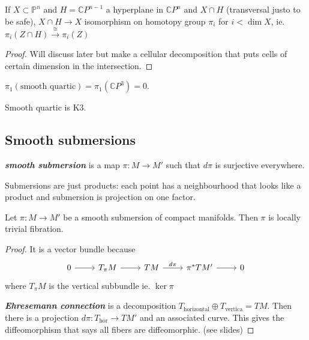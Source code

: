 \begin{thm}\leavevmode
	If $X \subset \mathbb{P}^n$ and $H=\mathbb{C}P^{n-1}$ a hyperplane in $\mathbb{C}P^{n}$ and $X\cap H$ (transversal justo to be safe), $X\cap H\to  X$ isomorphism on homotopy group $\pi_i$ for  $i<\dim X$, ie.
	$\pi_{i}(Z\cap H)\overset{\cong }{\longrightarrow}\pi_{i}(Z)$
\end{thm}

\begin{proof}
	Will discuss later but make a cellular decomposition that puts cells of certain dimension in the intersection.
\end{proof}

\begin{coro}
	$\pi_{1}(\text{smooth quartic} ) =\pi_{1}(\mathbb{C}P^{3}) =0$.
\end{coro}

\begin{coro}
	Smooth quartic is K3.
\end{coro}

\subsection{Smooth submersions}

\begin{defn}
	\textit{\textbf{smooth submersion}} is a map  $\pi:M\to M'$ such that $d\pi$ is surjective everywhere.
\end{defn}

\begin{remark}
	Submersions are just products: each point has a neighbourhood that looks like a product and submersion is projection on one factor.
\end{remark}

\begin{thm}\leavevmode
	Let $\pi:M\to M'$ be a smooth submersion of compact manifolds. Then $\pi$ is locally trivial fibration.
\end{thm}

\begin{proof}
	It is a vector bundle because
	\[\begin{tikzcd}
		0\arrow[r]&T_\pi M\arrow[r]&TM\arrow[r,"d\pi"]&\pi^*TM'\arrow[r]&0
	\end{tikzcd}\]
	where $T_\pi M$ is the vertical subbundle ie. $\ker \pi$

	\textit{\textbf{Ehresemann connection}} is a decomposition  $T_{\text{horizontal} }\oplus T_{\text{vertica} }=TM$. Then there is a projection $d\pi:T_\text{hor}\to TM' $ and an associated curve. This gives the diffeomorphism that says all fibers are diffeomorphic. (see slides)
\end{proof}

